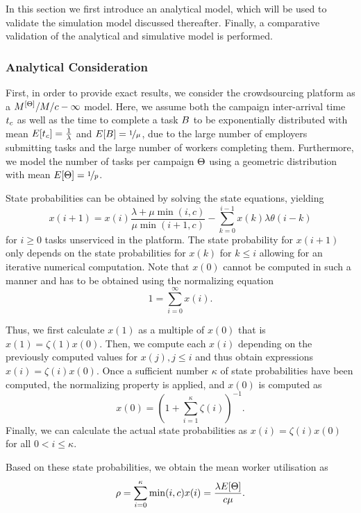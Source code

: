In this section we first introduce an analytical model, which will be used to validate the simulation model discussed thereafter.
Finally, a comparative validation of the analytical and simulative model is performed.

\subsubsection*{Analytical Consideration}

First, in order to provide exact results, we consider the crowdsourcing platform as a \(M^{[\Theta]}/M/c-\infty\) model.
Here, we assume both the campaign inter-arrival time \(t_c\) as well as the time to complete a task \(B\) to be exponentially distributed with mean \(E[t_c] = \frac{1}{\lambda}\) and \(E[B] = \nicefrac{1}{\mu}\), due to the large number of employers submitting tasks and the large number of workers completing them.
Furthermore, we model the number of tasks per campaign \(\Theta\) using a geometric distribution with mean \(E[\Theta] = \nicefrac{1}{p}\).

State probabilities\cite{Kleinrock1975} can be obtained by solving the state equations, yielding
\[
x(i + 1) = x(i) \frac{\lambda + \mu \min(i, c)}{\mu \min(i + 1, c)} - \sum_{k=0}^{i-1} x(k) \lambda \theta(i - k)
\]
for \(i \geq 0\) tasks unserviced in the platform.
The state probability for \(x(i+1)\) only depends on the state probabilities for \(x(k)\) for \(k \leq i\) allowing for an iterative numerical computation.
Note that \(x(0)\) cannot be computed in such a manner and has to be obtained using the normalizing equation 
\[
1 = \sum_{i=0}^{\infty} x(i).
\]

Thus, we first calculate \(x(1)\) as a multiple of \(x(0)\) that is \(x(1) = \zeta(1) x(0)\).
Then, we compute each \(x(i)\) depending on the previously computed values for \(x(j), j \leq i\) and thus obtain expressions \(x(i) = \zeta(i) x(0)\).  
Once a sufficient number \(\kappa\) of state probabilities have been computed, the normalizing property is applied, and \(x(0)\) is computed as
\[
	x(0) = \left(1 + \sum_{i = 1}^\kappa \zeta(i)\right)^{-1}.
\]
Finally, we can calculate the actual state probabilities as \(x(i) = \zeta(i) x(0)\) for all \(0 < i \leq \kappa\).

Based on these state probabilities, we obtain the mean worker utilisation as
\[
\rho = \sum_{i=0}^{\kappa} \min(i, c) x(i) = \frac{\lambda E[\Theta]}{c\mu}. 
\]

